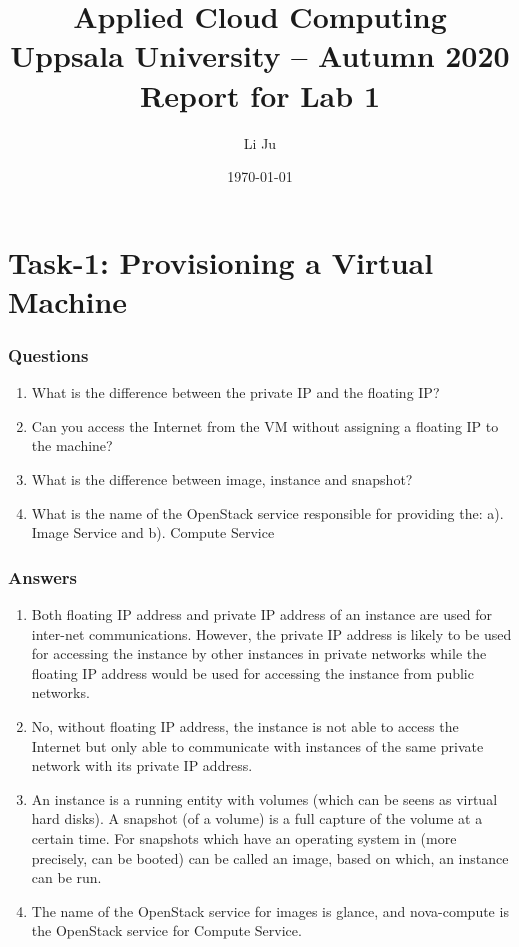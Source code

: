 \documentclass[a4paper,11pt]{article}
\title{\textbf{Applied Cloud Computing\\
    Uppsala University -- Autumn 2020 \\
    Report for Lab 1}}
\author{Li Ju}
\date{\today}
\begin{document}
\maketitle

\part{Task-1: Provisioning a Virtual Machine}
\section{Questions}
\begin{enumerate}
    \item What is the difference between the private IP and the floating IP?
    \item Can you access the Internet from the VM without assigning a floating IP to the machine?
    \item What is the difference between image, instance and snapshot?
    \item What is the name of the OpenStack service responsible for providing the: a). Image Service and b). Compute Service
\end{enumerate}

\section{Answers}
\begin{enumerate}
    \item Both floating IP address and private IP address of an instance are used for inter-net communications. However, the private IP address is likely to be used for accessing the instance by other instances in private networks while the floating IP address would be used for accessing the instance from public networks\cite{IPdifferences}.
    \item No, without floating IP address, the instance is not able to access the Internet but only able to communicate with instances of the same private network with its private IP address. 
    \item An instance is a running entity with volumes (which can be seens as virtual hard disks). A snapshot (of a volume) is a full capture of the volume at a certain time. For snapshots which have an operating system in (more precisely, can be booted) can be called an image, based on which, an instance can be run\cite{imagesnapshot}.
    \item The name of the OpenStack service for images is glance, and nova-compute is the OpenStack service for Compute Service. 
\end{enumerate}
\end{document}
